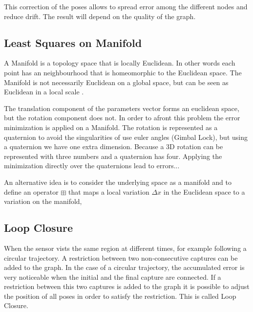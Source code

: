 This correction of the poses allows to spread error among the different nodes and reduce drift. The result 
will depend on the quality of the graph.

\subsection{Least Squares on Manifold}

A Manifold is a topology space that is locally Euclidean. In other words each point has an neighbourhood that is 
homeomorphic to the Euclidean space. The Manifold is not necessarily Euclidean on a global space, but can be seen 
as Euclidean in a local scale \cite{manifold}.

The translation component of the parameters vector forms an euclidean space, but the rotation component does not.
In order to afront this problem the error minimization is applied on a Manifold. The rotation is represented as a 
quaternion to avoid the singularities of use euler angles (Gimbal Lock), but using a quaternion we have one extra 
dimension. Because a 3D rotation can be represented with three numbers and a quaternion has four. Applying the 
minimization directly over the quaternions lead to errors...

An alternative idea is to consider the underlying space as a manifold
and to define an operator $\boxplus$ that maps a local variation
$\Delta x$ in the Euclidean space to a variation on the manifold,




\subsection{Loop Closure}

When the sensor vists the same region at different times, for example following 
a circular trajectory. A restriction between two non-consecutive captures can be 
added to the graph. In the case of a circular trajectory, the accumulated error 
is very noticeable when the initial and the final capture are connected. If a 
restriction between this two captures is added to the graph it is possible to 
adjust the position of all poses in order to satisfy the restriction. This 
is called Loop Closure.


